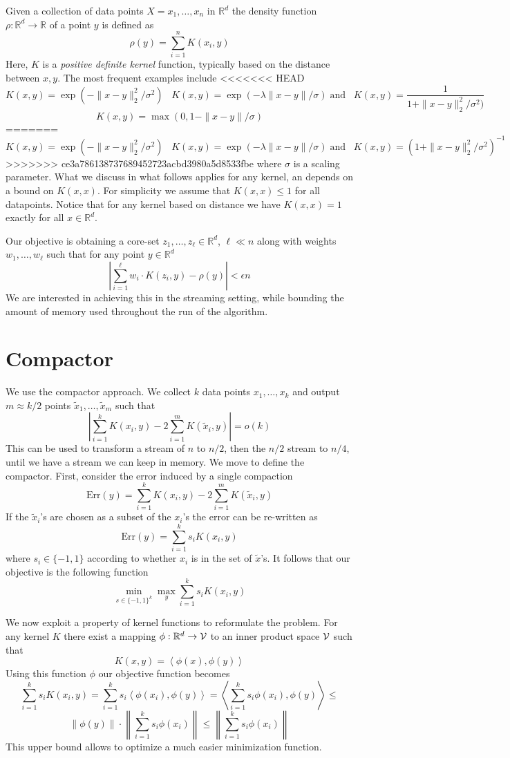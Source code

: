 \documentclass{article} %
\newcommand{\ip}[1]{\left \langle #1 \right \rangle}
\newcommand{\R}{\mathbb{R}}
\newcommand{\D}{\rho}
\newcommand{\eps}{\epsilon}
\begin{document}
Given a collection of data points $X = x_1,\ldots, x_n$ in $\R^d$ the density function $\rho: \R^d \rightarrow \R$ of a point $y$ is defined as 
$$ \rho(y) = \sum_{i=1}^{n} K(x_i,y) $$
Here, $K$ is a \emph{positive definite kernel} function, typically based on the distance between $x,y$. The most frequent examples include
<<<<<<< HEAD
$$ K(x,y) = \exp(- \|x-y\|_2^2/\sigma^2)\;\;\; K(x,y) = \exp(-\lambda \|x-y\|/\sigma) \; \mbox{and}\;\;\; K(x,y) = \frac{1}{1+\|x-y\|_2^2/\sigma^2)}$$
$$ K(x,y) = \max(0, 1- \|x-y\|/\sigma) $$
=======
$$ K(x,y) = \exp(- \|x-y\|_2^2/\sigma^2)\;\;\; K(x,y) = \exp(-\lambda \|x-y\|/\sigma) \; \mbox{and}\;\;\; K(x,y) = (1+\|x-y\|_2^2/\sigma^2)^{-1}$$
>>>>>>> ce3a786138737689452723acbd3980a5d8533fbe
where $\sigma$ is a scaling parameter. What we discuss in what follows applies for any kernel, an depends on a bound on $K(x,x)$. For simplicity we assume that $K(x,x) \leq 1$ for all datapoints. Notice that for any kernel based on distance we have $K(x,x)=1$ exactly for all $x \in \R^d$.

Our objective is obtaining a core-set $z_1,\ldots, z_\ell \in \R^d$, $\ell \ll n$ along with weights $w_1,\ldots, w_\ell$ such that for any point $y \in \R^d$
$$ \left| \sum_{i=1}^\ell w_i \cdot K(z_i, y) - \D(y) \right| < \eps n $$
We are interested in achieving this in the streaming setting, while bounding the amount of memory used throughout the run of the algorithm.

\section{Compactor}
We use the compactor approach. We collect $k$ data points $x_1,\ldots, x_k$ and output $m \approx k/2$ points $\tilde{x}_1,\ldots, \tilde{x}_m$ such that 
$$ \left| \sum_{i =1}^k K(x_i,y) - 2\sum_{i=1}^m K(\tilde{x}_i, y) \right| = o(k)$$
This can be used to transform a stream of $n$ to $n/2$, then the $n/2$ stream to $n/4$, until we have a stream we can keep in memory. We move to define the compactor. First, consider the error induced by a single compaction
$$ \text{Err}(y) = \sum_{i =1}^k K(x_i,y) - 2\sum_{i=1}^m K(\tilde{x}_i, y) $$
If the $\tilde{x}_i$'s are chosen as a subset of the $x_i$'s the error can be re-written as
$$ \text{Err}(y) = \sum_{i=1}^k s_i K(x_i,y)  $$
where $s_i \in \{-1, 1\}$ according to whether $x_i$ is in the set of $\tilde{x}$'s. It follows that our objective is the following function
$$ \min_{s \in \{-1,1\}^k} \max_y \sum_{i=1}^k s_i K(x_i,y) $$

We now exploit a property of kernel functions to reformulate the problem. For any kernel $K$ there exist a mapping $\phi: \R^d \to {\cal V}$ to an inner product space $\cal V$ such that 
$$ K(x,y) = \ip{\phi(x), \phi(y)} $$
Using this function $\phi$ our objective function becomes
$$\sum_{i=1}^k s_i K(x_i,y) = \sum_{i=1}^k s_i \ip{\phi(x_i), \phi(y)} =  \ip{ \sum_{i=1}^k s_i \phi(x_i), \phi(y)} \leq $$
$$ \|\phi(y)\| \cdot \left\|  \sum_{i=1}^k s_i \phi(x_i) \right\| \leq  \left\|  \sum_{i=1}^k s_i \phi(x_i) \right\| $$
This upper bound allows to optimize a much easier minimization function. 
\end{document}
